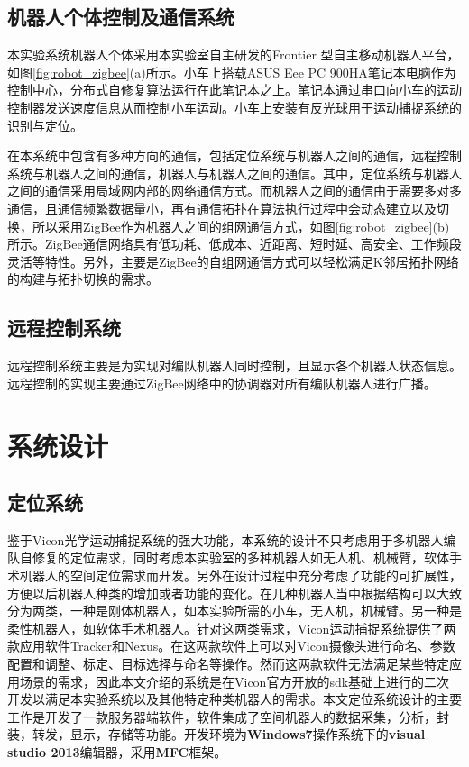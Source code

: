 \subsection{机器人个体控制及通信系统}
本实验系统机器人个体采用本实验室自主研发的Frontier \uppercase\expandafter{} 型自主移动机器人平台，如图\ref{fig:robot_zigbee}(a)所示。小车上搭载ASUS Eee PC 900HA笔记本电脑作为控制中心，分布式自修复算法运行在此笔记本之上。笔记本通过串口向小车的运动控制器发送速度信息从而控制小车运动。小车上安装有反光球用于运动捕捉系统的识别与定位。
\begin{figure*}[!htbp]
	\centering
	\hspace{1cm}
\end{figure*}

在本系统中包含有多种方向的通信，包括定位系统与机器人之间的通信，远程控制系统与机器人之间的通信，机器人与机器人之间的通信。其中，定位系统与机器人之间的通信采用局域网内部的网络通信方式。而机器人之间的通信由于需要多对多通信，且通信频繁数据量小，再有通信拓扑在算法执行过程中会动态建立以及切换，所以采用ZigBee作为机器人之间的组网通信方式，如图\ref{fig:robot_zigbee}(b)所示。ZigBee通信网络具有低功耗、低成本、近距离、短时延、高安全、工作频段灵活等特性。另外，主要是ZigBee的自组网通信方式可以轻松满足K邻居拓扑网络的构建与拓扑切换的需求。

\subsection{远程控制系统}
远程控制系统主要是为实现对编队机器人同时控制，且显示各个机器人状态信息。远程控制的实现主要通过ZigBee网络中的协调器对所有编队机器人进行广播。

\section{系统设计}

\subsection{定位系统}
鉴于Vicon光学运动捕捉系统的强大功能，本系统的设计不只考虑用于多机器人编队自修复的定位需求，同时考虑本实验室的多种机器人如无人机、机械臂，软体手术机器人的空间定位需求而开发。另外在设计过程中充分考虑了功能的可扩展性，方便以后机器人种类的增加或者功能的变化。在几种机器人当中根据结构可以大致分为两类，一种是刚体机器人，如本实验所需的小车，无人机，机械臂。另一种是柔性机器人，如软体手术机器人。针对这两类需求，Vicon运动捕捉系统提供了两款应用软件Tracker和Nexus。在这两款软件上可以对Vicon摄像头进行命名、参数配置和调整、标定、目标选择与命名等操作。然而这两款软件无法满足某些特定应用场景的需求，因此本文介绍的系统是在Vicon官方开放的sdk基础上进行的二次开发以满足本实验系统以及其他特定种类机器人的需求。本文定位系统设计的主要工作是开发了一款服务器端软件，软件集成了空间机器人的数据采集，分析，封装，转发，显示，存储等功能。开发环境为\textbf{Windows7}操作系统下的\textbf{visual studio 2013}编辑器，采用\textbf{MFC}框架。

